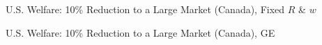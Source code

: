 \documentclass[9pt,pdftex,aspectratio=1610]{beamer}
\theoremstyle{definition}
\begin{document}
\begin{frame}[t]{U.S. Welfare: 10\% Reduction to a Large Market (Canada), {\color{red} Fixed $R$ \& $w$} }
\vspace{-.5cm}
\begin{figure}[t]
\end{figure}
\end{frame}

\begin{frame}[t]{U.S. Welfare: 10\% Reduction to a Large Market (Canada), {\color{red} GE } }
\vspace{-.5cm}
\begin{figure}[!t]
\end{figure}
\end{frame}
\end{document}

